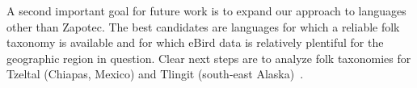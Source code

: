 \documentclass[10pt,letterpaper]{article}
\begin{document}
A second important goal for future work is to expand our approach to languages other than Zapotec. The best candidates are languages for which a reliable folk taxonomy is available and for which eBird data  
is relatively plentiful for the geographic region in question.  Clear next steps are to analyze folk taxonomies for Tzeltal (Chiapas, Mexico)  and Tlingit (south-east Alaska)~\cite{hunn1977tzeltal,hunn2012tlingit}.







\end{document}
